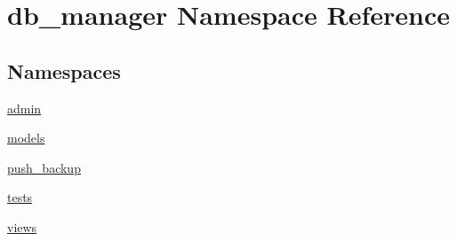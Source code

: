 \hypertarget{namespacedb__manager}{\section{db\-\_\-manager Namespace Reference}
\label{namespacedb__manager}
}
\subsection*{Namespaces}
\begin{DoxyCompactItemize}
\item 
\hyperlink{namespacedb__manager_1_1admin}{admin}
\item 
\hyperlink{namespacedb__manager_1_1models}{models}
\item 
\hyperlink{namespacedb__manager_1_1push__backup}{push\-\_\-backup}
\item 
\hyperlink{namespacedb__manager_1_1tests}{tests}
\item 
\hyperlink{namespacedb__manager_1_1views}{views}
\end{DoxyCompactItemize}
